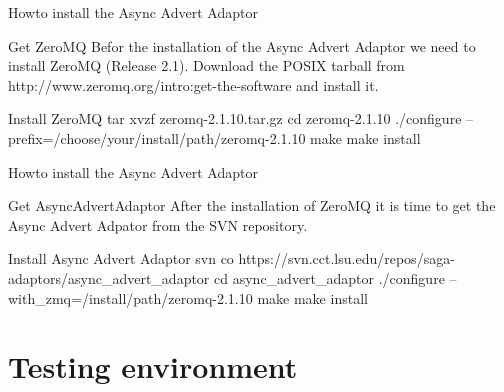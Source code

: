 \documentclass{beamer}
\begin{document}
    \begin{frame}{Howto install the Async Advert Adaptor}
      \begin{block}{Get ZeroMQ}
        Befor the installation of the Async Advert Adaptor we need to install ZeroMQ (Release 2.1). 
        Download the POSIX tarball from http://www.zeromq.org/intro:get-the-software and install it.
      \end{block}
      
      \begin{exampleblock}{Install ZeroMQ}
         tar xvzf zeromq-2.1.10.tar.gz \newline
         cd zeromq-2.1.10 \newline
         ./configure --prefix=/choose/your/install/path/zeromq-2.1.10 \newline
         make \newline
         make install
      \end{exampleblock}
    \end{frame}
    
    \begin{frame}{Howto install the Async Advert Adaptor}
      \begin{block}{Get AsyncAdvertAdaptor}
        After the installation of ZeroMQ it is time to get the Async Advert Adpator
        from the SVN repository. 
      \end{block}
      
      \begin{exampleblock}{Install Async Advert Adaptor}
        svn co https://svn.cct.lsu.edu/repos/saga-adaptors/async\_advert\_adaptor \newline
        cd async\_advert\_adaptor \newline
        ./configure --with\_zmq=/install/path/zeromq-2.1.10 \newline
        make \newline
        make install
      \end{exampleblock}
    \end{frame}
    
  \section{Testing environment}
    \begin{frame}
    \end{frame}
    
\end{document}
